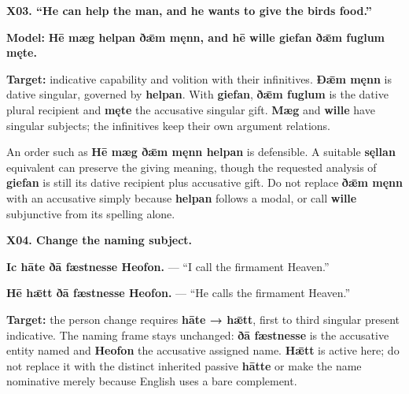 \par\begin{minipage}{\linewidth}\raggedright
\textbf{X03. “He can help the man, and he wants to give the birds food.”}

\textbf{Model:} \textbf{Hē mæg helpan ðǣm męnn, and hē wille giefan ðǣm fuglum męte.}

\textbf{Target:} indicative capability and volition with their infinitives. \textbf{Ðǣm męnn} is dative singular, governed by \textbf{helpan}. With \textbf{giefan}, \textbf{ðǣm fuglum} is the dative plural recipient and \textbf{męte} the accusative singular gift. \textbf{Mæg} and \textbf{wille} have singular subjects; the infinitives keep their own argument relations.

An order such as \textbf{Hē mæg ðǣm męnn helpan} is defensible. A suitable \textbf{sęllan} equivalent can preserve the giving meaning, though the requested analysis of \textbf{giefan} is still its dative recipient plus accusative gift. Do not replace \textbf{ðǣm męnn} with an accusative simply because \textbf{helpan} follows a modal, or call \textbf{wille} subjunctive from its spelling alone.

\end{minipage}\par\addvspace{4pt}

\par\begin{minipage}{\linewidth}\raggedright
\textbf{X04. Change the naming subject.}

\textbf{Ic hāte ðā fæstnesse Heofon.} — “I call the firmament Heaven.”

\textbf{Hē hǣtt ðā fæstnesse Heofon.} — “He calls the firmament Heaven.”

\textbf{Target:} the person change requires \textbf{hāte → hǣtt}, first to third singular present indicative. The naming frame stays unchanged: \textbf{ðā fæstnesse} is the accusative entity named and \textbf{Heofon} the accusative assigned name. \textbf{Hǣtt} is active here; do not replace it with the distinct inherited passive \textbf{hātte} or make the name nominative merely because English uses a bare complement.

\end{minipage}\par\addvspace{4pt}

